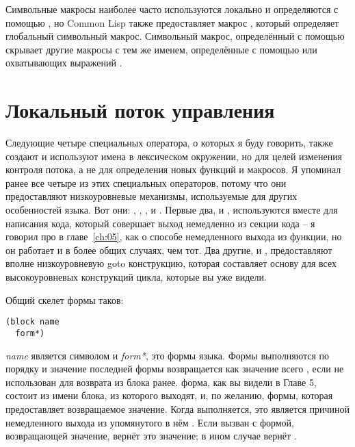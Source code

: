 Символьные макросы наиболее часто используются локально и определяются с помощью
, но Common Lisp также предоставляет макрос
, который определяет глобальный символьный макрос.  Символьный
макрос, определённый с помощью  скрывает другие макросы с тем же
именем, определённые с помощью  или охватывающих выражений
.

\section{Локальный поток управления}

Следующие четыре специальных оператора, о которых я буду говорить, также создают и
используют имена в лексическом окружении, но для целей изменения контроля потока, а не для
определения новых функций и макросов. Я упоминал ранее все четыре из этих специальных
операторов, потому что они предоставляют низкоуровневые механизмы, используемые для других
особенностей языка. Вот они: , , , и
. Первые два,  и , используются вместе для
написания кода, который совершает выход немедленно из секции кода -- я говорил про
 в главе~\ref{ch:05}, как о способе немедленного выхода из функции, но
он работает и в более общих случаях, чем тот. Два другие,  и ,
предоставляют вполне низкоуровневую goto конструкцию, которая составляет основу для всех
высокоуровневых конструкций цикла, которые вы уже видели.

Общий скелет формы  таков:

\begin{lstlisting}
(block name
  form*)
\end{lstlisting}

\textit{name} является символом и \textit{form*}, это формы языка. Формы выполняются по
порядку и значение последней формы возвращается как значение всего , если не
использован  для возврата из блока ранее.  форма, как
вы видели в Главе 5, состоит из имени блока, из которого выходят, и, по желанию, формы,
которая предоставляет возвращаемое значение.  Когда  выполняется, это
является причиной немедленного выхода из упомянутого в нём .  Если
 вызван с формой, возвращающей значение,  вернёт это
значение; в ином случае  вернёт .

